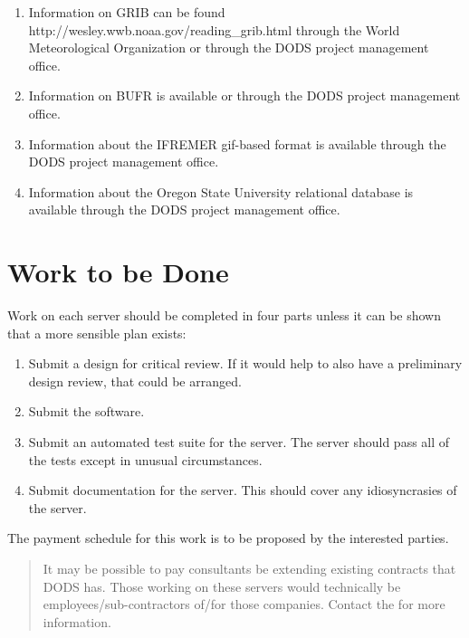 \documentclass[12pt]{article}
\begin{document}
\begin{enumerate}
  
\item Information on GRIB can be found 
  {http://wesley.wwb.noaa.gov/reading\_grib.html} through the World
  Meteorological Organization or through the DODS project management office.

\item Information on BUFR is available  or through
  the DODS project management office.
  
\item Information about the IFREMER gif-based format is available through the
  DODS project management office.

\item Information about the Oregon State University relational database is
  available through the DODS project management office.
  
\end{enumerate}

\section{Work to be Done}

Work on each server should be completed in four parts unless it can be
shown that a more sensible plan exists:

\begin{enumerate}
  
\item Submit a design for critical review. If it would help to also have a
  preliminary design review, that could be arranged.

\item Submit the software.

\item Submit an automated test suite for the server. The server should pass
  all of the tests except in unusual circumstances.

\item Submit documentation for the server. This should cover any
  idiosyncrasies of the server. 

\end{enumerate}

The payment schedule for this work is to be proposed by the interested
parties. 

\begin{quote}
  
  It may be possible to pay consultants be extending existing contracts
  that DODS has. Those working on these servers would technically be
  employees/sub-contractors of/for those companies. Contact the
   for more
  information.

\end{quote}
\end{document}
